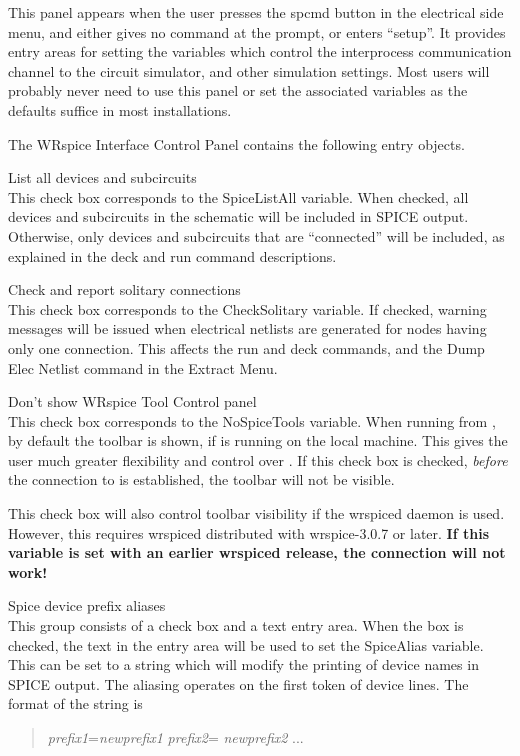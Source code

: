 This panel appears when the user presses the {\cb spcmd} button in the
electrical side menu, and either gives no command at the prompt, or
enters ``{\vt setup}''.  It provides entry areas for setting the
variables which control the interprocess communication channel to the
{\WRspice} circuit simulator, and other simulation settings.  Most
users will probably never need to use this panel or set the associated
variables as the defaults suffice in most installations.

The {\cb WRspice Interface Control Panel} contains the following entry
objects.

\begin{description}
\item{\cb List all devices and subcircuits}\\
This check box corresponds to the {\et SpiceListAll} variable.  When
checked, all devices and subcircuits in the schematic will be included
in SPICE output.  Otherwise, only devices and subcircuits that are
``connected'' will be included, as explained in the {\cb deck} and
{\cb run} command descriptions.

\item{\cb Check and report solitary connections}\\
This check box corresponds to the {\et CheckSolitary} variable.  If
checked, warning messages will be issued when electrical netlists are
generated for nodes having only one connection.  This affects the {\cb
run} and {\cb deck} commands, and the {\cb Dump Elec Netlist} command
in the {\cb Extract Menu}.

\item{\cb Don't show WRspice Tool Control panel}\\
This check box corresponds to the {\et NoSpiceTools} variable.  When
running {\WRspice} from {\Xic}, by default the {\WRspice} toolbar is
shown, if {\WRspice} is running on the local machine.  This gives the
user much greater flexibility and control over {\WRspice}.  If this
check box is checked, {\it before} the connection to {\WRspice} is
established, the toolbar will not be visible.

This check box will also control toolbar visibility if the {\vt
wrspiced} daemon is used.  However, this requires {\vt wrspiced}
distributed with wrspice-3.0.7 or later.  {\bf If this variable is set
with an earlier {\vt wrspiced} release, the {\WRspice} connection will
not work!}

\item{\cb Spice device prefix aliases}\\
This group consists of a check box and a text entry area.  When the
box is checked, the text in the entry area will be used to set the
{\et SpiceAlias} variable.  This can be set to a string which will
modify the printing of device names in SPICE output.  The aliasing
operates on the first token of device lines.  The format of the string
is
\begin{quote}
{\it prefix1\/}{\vt =}{\it newprefix1} {\it prefix2\/}{\vt =}{\it
newprefix2} ...
\end{quote}


\end{description}
